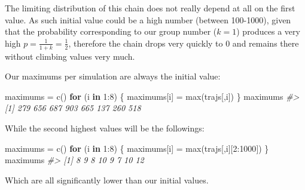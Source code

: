 \documentclass[
]{article}
\newenvironment{Shaded}{\begin{snugshade}}{\end{snugshade}}
\newcommand{\CommentTok}[1]{\textcolor[rgb]{0.56,0.35,0.01}{\textit{#1}}}
\newcommand{\ControlFlowTok}[1]{\textcolor[rgb]{0.13,0.29,0.53}{\textbf{#1}}}
\newcommand{\DecValTok}[1]{\textcolor[rgb]{0.00,0.00,0.81}{#1}}
\newcommand{\FunctionTok}[1]{\textcolor[rgb]{0.00,0.00,0.00}{#1}}
\newcommand{\NormalTok}[1]{#1}
\newcommand{\OtherTok}[1]{\textcolor[rgb]{0.56,0.35,0.01}{#1}}
\newcommand{\SpecialCharTok}[1]{\textcolor[rgb]{0.00,0.00,0.00}{#1}}
\begin{document}
The limiting distribution of this chain does not really depend at all on
the first value. As such initial value could be a high number (between
100-1000), given that the probability corresponding to our group number
(\(k=1\)) produces a very high \(p=\frac{1}{1+k} = \frac{1}{2}\),
therefore the chain drops very quickly to 0 and remains there without
climbing values very much.

Our maximums per simulation are always the initial value:

\begin{Shaded}
\begin{Highlighting}[]
\NormalTok{maximums }\OtherTok{=} \FunctionTok{c}\NormalTok{()}
\ControlFlowTok{for}\NormalTok{ (i }\ControlFlowTok{in} \DecValTok{1}\SpecialCharTok{:}\DecValTok{8}\NormalTok{) \{}
\NormalTok{    maximums[i] }\OtherTok{=} \FunctionTok{max}\NormalTok{(trajs[,i])}
\NormalTok{\}}
\NormalTok{maximums}
\CommentTok{\#\textgreater{} [1] 279 656 687 903 665 137 260 518}
\end{Highlighting}
\end{Shaded}

While the second highest values will be the followings:

\begin{Shaded}
\begin{Highlighting}[]
\NormalTok{maximums }\OtherTok{=} \FunctionTok{c}\NormalTok{()}
\ControlFlowTok{for}\NormalTok{ (i }\ControlFlowTok{in} \DecValTok{1}\SpecialCharTok{:}\DecValTok{8}\NormalTok{) \{}
\NormalTok{    maximums[i] }\OtherTok{=} \FunctionTok{max}\NormalTok{(trajs[,i][}\DecValTok{2}\SpecialCharTok{:}\DecValTok{1000}\NormalTok{])}
\NormalTok{\}}
\NormalTok{maximums}
\CommentTok{\#\textgreater{} [1]  8  9  8 10  9  7 10 12}
\end{Highlighting}
\end{Shaded}

Which are all significantly lower than our initial values.
\end{document}
